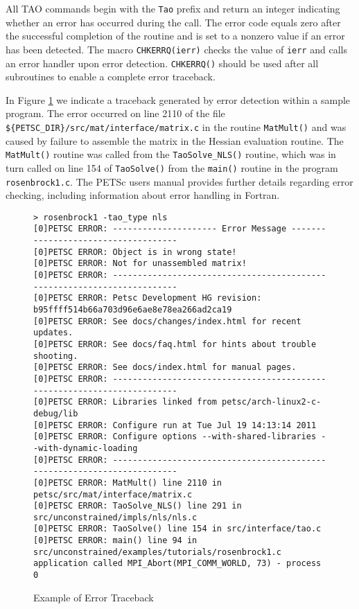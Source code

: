 All TAO commands begin with the \texttt{Tao} prefix and return an
integer indicating whether an error has occurred during the call.  The
error code equals zero after the successful completion of the routine
and is set to a nonzero value if an error has been detected.  The
macro \texttt{CHKERRQ(ierr)} checks the value of \texttt{ierr} and calls an
error handler upon error detection.  \texttt{CHKERRQ()} should be used after
all subroutines to enable a complete error traceback.

In Figure \ref{fig:traceback} we indicate a traceback generated by
error detection within a sample program. The error occurred on line
2110 of the file \texttt{\$\{PETSC\_DIR\}/src/mat/inter\-face/mat\-rix.c} in the
routine \texttt{MatMult()} and was caused by failure to assemble the 
matrix in the Hessian evaluation routine.
The \texttt{MatMult()} routine was called from
the \texttt{TaoSolve\_NLS()} routine, which was in turn called on line 
154 of \texttt{TaoSolve()} from the \texttt{main()} routine 
in the program \texttt{rosenbrock1.c}.  The PETSc users
manual \cite{petsc-user-ref} provides further details
regarding error checking, including
information about error handling in Fortran.

\begin{figure}[htb]
{\footnotesize
\begin{verbatim}
> rosenbrock1 -tao_type nls
[0]PETSC ERROR: --------------------- Error Message ------------------------------------
[0]PETSC ERROR: Object is in wrong state!
[0]PETSC ERROR: Not for unassembled matrix!
[0]PETSC ERROR: ------------------------------------------------------------------------
[0]PETSC ERROR: Petsc Development HG revision: b95ffff514b66a703d96e6ae8e78ea266ad2ca19
[0]PETSC ERROR: See docs/changes/index.html for recent updates.
[0]PETSC ERROR: See docs/faq.html for hints about trouble shooting.
[0]PETSC ERROR: See docs/index.html for manual pages.
[0]PETSC ERROR: ------------------------------------------------------------------------
[0]PETSC ERROR: Libraries linked from petsc/arch-linux2-c-debug/lib
[0]PETSC ERROR: Configure run at Tue Jul 19 14:13:14 2011
[0]PETSC ERROR: Configure options --with-shared-libraries --with-dynamic-loading
[0]PETSC ERROR: ------------------------------------------------------------------------
[0]PETSC ERROR: MatMult() line 2110 in petsc/src/mat/interface/matrix.c
[0]PETSC ERROR: TaoSolve_NLS() line 291 in src/unconstrained/impls/nls/nls.c
[0]PETSC ERROR: TaoSolve() line 154 in src/interface/tao.c
[0]PETSC ERROR: main() line 94 in src/unconstrained/examples/tutorials/rosenbrock1.c
application called MPI_Abort(MPI_COMM_WORLD, 73) - process 0
\end{verbatim}
}
\caption{Example of Error Traceback}
\label{fig:traceback}
\end{figure}

